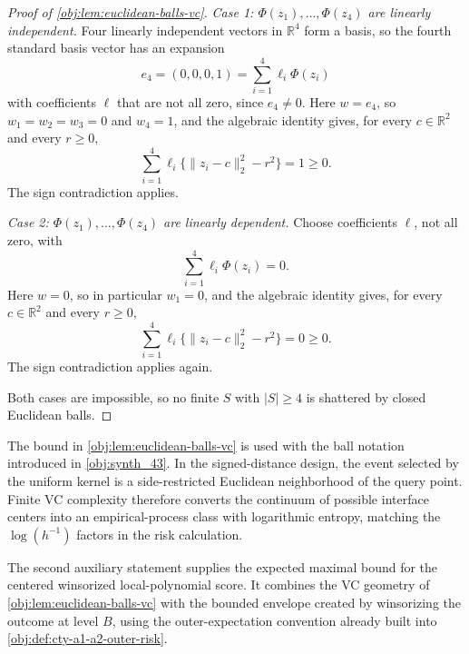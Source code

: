 \documentclass[11pt]{article}
\begin{document}
\begin{proof}[Proof of \cref{obj:lem:euclidean-balls-vc}]
\emph{Case 1: \(\Phi(z_1),\ldots,\Phi(z_4)\) are linearly independent.}  Four linearly
independent vectors in \(\mathbb R^4\) form a basis, so the fourth standard basis vector has
an expansion
\[
e_4=(0,0,0,1)=\sum_{i=1}^4\ell_i\Phi(z_i)
\]
with coefficients \(\ell\) that are not all zero, since \(e_4\neq0\).  Here \(w=e_4\), so
\(w_1=w_2=w_3=0\) and \(w_4=1\), and the algebraic identity gives, for every
\(c\in\mathbb R^2\) and every \(r\ge0\),
\[
\sum_{i=1}^4\ell_i\{\|z_i-c\|_2^2-r^2\}=1\ge0 .
\]
The sign contradiction applies.

\emph{Case 2: \(\Phi(z_1),\ldots,\Phi(z_4)\) are linearly dependent.}  Choose coefficients
\(\ell\), not all zero, with
\[
\sum_{i=1}^4\ell_i\Phi(z_i)=0 .
\]
Here \(w=0\), so in particular \(w_1=0\), and the algebraic identity gives, for every
\(c\in\mathbb R^2\) and every \(r\ge0\),
\[
\sum_{i=1}^4\ell_i\{\|z_i-c\|_2^2-r^2\}=0\ge0 .
\]
The sign contradiction applies again.

Both cases are impossible, so no finite \(S\) with \(|S|\ge4\) is shattered by closed
Euclidean balls.
\end{proof}

The bound in \cref{obj:lem:euclidean-balls-vc} is used with the ball notation introduced in \cref{obj:synth_43}. In the signed-distance design, the event selected by the uniform kernel is a side-restricted Euclidean neighborhood of the query point. Finite VC complexity therefore converts the continuum of possible interface centers into an empirical-process class with logarithmic entropy, matching the \(\log(h^{-1})\) factors in the risk calculation.

The second auxiliary statement supplies the expected maximal bound for the centered winsorized local-polynomial score. It combines the VC geometry of \cref{obj:lem:euclidean-balls-vc} with the bounded envelope created by winsorizing the outcome at level \(B\), using the outer-expectation convention already built into \cref{obj:def:cty-a1-a2-outer-risk}.
\end{document}
